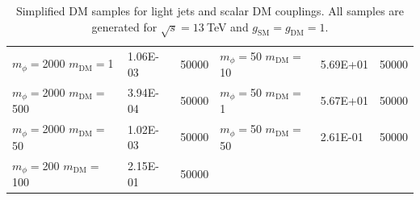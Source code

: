 \begin{table}[]
\begin{tabular}{lll||lll}
$m_\phi=$2000 $m_\textrm{DM}=$1           & 1.06E-03     & 50000                  & $m_\phi=$50 $m_\textrm{DM}=$10            & 5.69E+01     & 50000                  \\ 
$m_\phi=$2000 $m_\textrm{DM}=$500         & 3.94E-04     & 50000                  & $m_\phi=$50 $m_\textrm{DM}=$1             & 5.67E+01     & 50000                  \\ 
$m_\phi=$2000 $m_\textrm{DM}=$50          & 1.02E-03     & 50000                  & $m_\phi=$50 $m_\textrm{DM}=$50            & 2.61E-01     & 50000                   \\  
$m_\phi=$200 $m_\textrm{DM}=$100          & 2.15E-01     & 50000                  \\\hline
\end{tabular}
\caption{Simplified DM samples for light jets and scalar DM couplings. All samples are generated for $\sqrt{s}=13~$TeV and $g_\textrm{SM}=g_\textrm{DM}=1$.}
\label{tab:samples_s}
\end{table}



